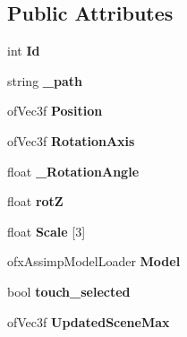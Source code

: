\subsection*{Public Attributes}
\begin{DoxyCompactItemize}
\item 
\hypertarget{class_models_a08e4a1ce46570a4e8bb5eda491931497}{int {\bfseries Id}}\label{class_models_a08e4a1ce46570a4e8bb5eda491931497}

\item 
\hypertarget{class_models_a318677972a173564ff5bd87a5aa8e559}{string {\bfseries \-\_\-path}}\label{class_models_a318677972a173564ff5bd87a5aa8e559}

\item 
\hypertarget{class_models_ac655be81daf8db2592fa0fc993d21513}{of\-Vec3f {\bfseries Position}}\label{class_models_ac655be81daf8db2592fa0fc993d21513}

\item 
\hypertarget{class_models_a30df459a3cdecfcb022a249bf0d7c7a1}{of\-Vec3f {\bfseries Rotation\-Axis}}\label{class_models_a30df459a3cdecfcb022a249bf0d7c7a1}

\item 
\hypertarget{class_models_a9b2355cae5df009b8e88afc2ca884b4c}{float {\bfseries \-\_\-\-Rotation\-Angle}}\label{class_models_a9b2355cae5df009b8e88afc2ca884b4c}

\item 
\hypertarget{class_models_a418140d6d6ea774f93b2662f57c3492e}{float {\bfseries rot\-Z}}\label{class_models_a418140d6d6ea774f93b2662f57c3492e}

\item 
\hypertarget{class_models_a379e4114791b1b42d199e7bb1666756f}{float {\bfseries Scale} \mbox{[}3\mbox{]}}\label{class_models_a379e4114791b1b42d199e7bb1666756f}

\item 
\hypertarget{class_models_a472e734e92b5f7d207f8199293c5239f}{ofx\-Assimp\-Model\-Loader {\bfseries Model}}\label{class_models_a472e734e92b5f7d207f8199293c5239f}

\item 
\hypertarget{class_models_ad416782a76759101ac4cb224f374ddb0}{bool {\bfseries touch\-\_\-selected}}\label{class_models_ad416782a76759101ac4cb224f374ddb0}

\item 
\hypertarget{class_models_a4402f6001c440d9a6821f7907cc86a82}{of\-Vec3f {\bfseries Updated\-Scene\-Max}}\label{class_models_a4402f6001c440d9a6821f7907cc86a82}


\end{DoxyCompactItemize}
